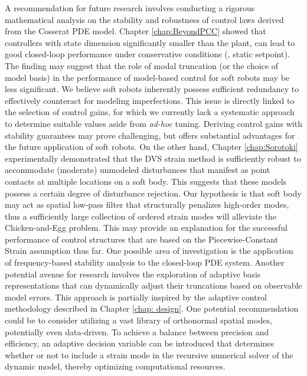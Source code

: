 A recommendation for future research involves conducting a rigorous mathematical analysis on the stability and robustness of control laws derived from the Cosserat PDE model. Chapter \ref{chap:BeyondPCC} showed that controllers with state dimension significantly smaller than the plant, can lead to good closed-loop performance under conservative conditions (\eg, static setpoint). The finding may suggest that the role of modal truncation (or the choice of model basis) in the performance of model-based control for soft robots may be less significant. We believe soft robots inherently possess sufficient redundancy to effectively counteract for modeling imperfections. This issue is directly linked to the selection of control gains, for which we currently lack a systematic approach to determine suitable values aside from \textit{ad-hoc} tuning. Deriving control gains with stability guarantees may prove challenging, but offers substantial advantages for the future application of soft robots. On the other hand, Chapter \ref{chap:Sorotoki} experimentally demonstrated that the DVS strain method is sufficiently robust to accommodate (moderate) unmodeled disturbances that manifest as point contacts at multiple locations on a soft body. This suggests that these models possess a certain degree of disturbance rejection. Our hypothesis is that soft body may act as spatial low-pass filter that structurally penalizes high-order modes, thus a sufficiently large collection of ordered strain modes will alleviate the {Chicken-and-Egg} problem. This may provide an explanation for the successful performance of control structures that are based on the Piecewise-Constant Strain assumption thus far. One possible area of investigation is the application of frequency-based stability analysis to the closed-loop PDE system. Another potential avenue for research involves the exploration of adaptive basis representations that can dynamically adjust their truncations based on observable model errors. This approach is partially inspired by the adaptive control methodology described in Chapter \ref{chap: design}. One potential recommendation could be to consider utilizing a vast library of orthonormal spatial modes, potentially even data-driven. To achieve a balance between precision and efficiency, an adaptive decision variable can be introduced that determines whether or not to include a strain mode in the recursive numerical solver of the dynamic model, thereby optimizing computational resources.

